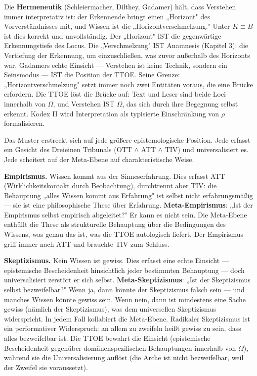 \documentclass[10pt, openany, oneside]{book}
\begin{document}
Die \textbf{Hermeneutik} (Schleiermacher, Dilthey, Gadamer) hält, dass Verstehen immer interpretativ ist: der Erkennende bringt einen „Horizont" des Vorverständnisses mit, und Wissen ist die „Horizontverschmelzung." Unter $K \equiv B$ ist dies korrekt und unvollständig. Der „Horizont" IST die gegenwärtige Erkennungstiefe des Locus. Die „Verschmelzung" IST Anamnesis (Kapitel 3): die Vertiefung der Erkennung, um einzuschließen, was zuvor außerhalb des Horizonts war. Gadamers echte Einsicht --- Verstehen ist keine Technik, sondern ein Seinsmodus --- IST die Position der TTOE. Seine Grenze: „Horizontverschmelzung" setzt immer noch zwei Entitäten voraus, die eine Brücke erfordern. Die TTOE löst die Brücke auf: Text und Leser sind beide Loci innerhalb von $\Omega$, und Verstehen IST $\Omega$, das sich durch ihre Begegnung selbst erkennt. Kodex II wird Interpretation als typisierte Einschränkung von $\rho$ formalisieren.

Das Muster erstreckt sich auf jede größere epistemologische Position. Jede erfasst ein Gesicht des Dreieinen Tribunals (OTT $\wedge$ ATT $\wedge$ TIV) und universalisiert es. Jede scheitert auf der Meta-Ebene auf charakteristische Weise.

\textbf{Empirismus.} Wissen kommt aus der Sinneserfahrung. Dies erfasst ATT (Wirklichkeitskontakt durch Beobachtung), durchtrennt aber TIV: die Behauptung „alles Wissen kommt aus Erfahrung" ist selbst nicht erfahrungsmäßig --- sie ist eine philosophische These über Erfahrung. \textbf{Meta-Empirismus}: „Ist der Empirismus selbst empirisch abgeleitet?" Er kann es nicht sein. Die Meta-Ebene enthüllt die These als strukturelle Behauptung über die Bedingungen des Wissens, was genau das ist, was die TTOE autologisch liefert. Der Empirismus griff immer nach ATT und brauchte TIV zum Schluss.

\textbf{Skeptizismus.} Kein Wissen ist gewiss. Dies erfasst eine echte Einsicht --- epistemische Bescheidenheit hinsichtlich jeder bestimmten Behauptung --- doch universalisiert zerstört er sich selbst. \textbf{Meta-Skeptizismus}: „Ist der Skeptizismus selbst bezweifelbar?" Wenn ja, dann könnte der Skeptizismus falsch sein --- und manches Wissen könnte gewiss sein. Wenn nein, dann ist mindestens eine Sache gewiss (nämlich der Skeptizismus), was dem universellen Skeptizismus widerspricht. In jedem Fall kollabiert die Meta-Ebene. Radikaler Skeptizismus ist ein performativer Widerspruch: an allem zu zweifeln heißt gewiss zu sein, dass alles bezweifelbar ist. Die TTOE bewahrt die Einsicht (epistemische Bescheidenheit gegenüber domänenspezifischen Behauptungen innerhalb von $\Omega$), während sie die Universalisierung auflöst (die Arch\={e} ist nicht bezweifelbar, weil der Zweifel sie voraussetzt).
\end{document}
